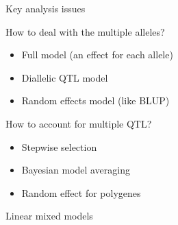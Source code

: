 \documentclass[12pt]{article}
\newcommand{\headsize}{\fontsize{35}{35} \selectfont}
\newcommand{\smallsize}{\fontsize{25}{30} \selectfont}
\newcommand{\smallersize}{\fontsize{20}{25} \selectfont}
\begin{document}
\newpage


\headsize \color{myyellow}
\hfill \begin{minipage}{5.75in}
\centering
Key analysis issues
\end{minipage}

\vspace{25mm}

\color{mywhite}
\smallsize

\hfill \begin{minipage}{9.5in}
How to deal with the multiple alleles?
\end{minipage}

\vspace{10mm}

\hfill \begin{minipage}{9in}
\color{myblue} \smallersize
\begin{itemize}
\item Full model (an effect for each allele)
\item Diallelic QTL model
\item Random effects model (like BLUP)
\end{itemize}
\end{minipage}

\vspace{20mm}

\color{mywhite}
\smallsize

\hfill \begin{minipage}{9.5in}
How to account for multiple QTL?

\vspace{10mm}

\hfill \begin{minipage}{9in}
\color{myblue} \smallersize
\begin{itemize}
\item Stepwise selection
\item Bayesian model averaging
\item Random effect for polygenes
\end{itemize}
\end{minipage}

\end{minipage}








\newpage

\headsize \color{myyellow}
\hfill\begin{minipage}{5.75in}
\centering
Linear mixed models
\end{minipage}
\end{document}
